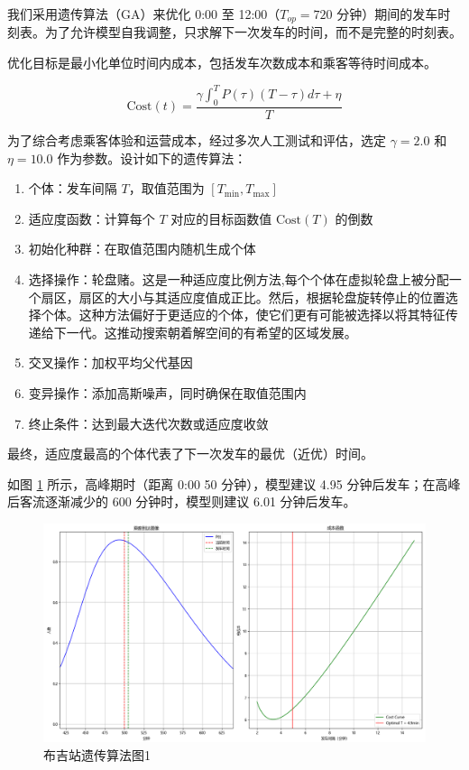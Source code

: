 
我们采用遗传算法（GA）\cite{HollandGA}来优化 0:00 至 12:00（$T_{op}=720$ 分钟）期间的发车时刻表。为了允许模型自我调整，只求解下一次发车的时间，而不是完整的时刻表。\cite{GoldbergGA}

优化目标是最小化单位时间内成本，包括发车次数成本和乘客等待时间成本。

$$
\text{Cost}(t) = \frac{\gamma \int _0 ^T P(\tau)(T-\tau)d\tau + \eta}{T}
$$

为了综合考虑乘客体验和运营成本，经过多次人工测试和评估，选定 $\gamma=2.0$ 和 $\eta=10.0$ 作为参数。设计如下的遗传算法：

\begin{enumerate}
    \item 个体：发车间隔 $T$，取值范围为 $[T_{\min}, T_{\max}]$
    \item 适应度函数：计算每个 $T$ 对应的目标函数值 $\text{Cost}(T)$ 的倒数
    \item 初始化种群：在取值范围内随机生成个体
    \item 选择操作：轮盘赌。这是一种适应度比例方法,每个个体在虚拟轮盘上被分配一个扇区，扇区的大小与其适应度值成正比。然后，根据轮盘旋转停止的位置选择个体。这种方法偏好于更适应的个体，使它们更有可能被选择以将其特征传递给下一代。这推动搜索朝着解空间的有希望的区域发展。
    \item 交叉操作：加权平均父代基因
    \item 变异操作：添加高斯噪声，同时确保在取值范围内
    \item 终止条件：达到最大迭代次数或适应度收敛
\end{enumerate}

最终，适应度最高的个体代表了下一次发车的最优（近优）时间。

如图 \ref{fig:gaBuji1} 所示，高峰期时（距离 0:00 50 分钟），模型建议 4.95 分钟后发车；在高峰后客流逐渐减少的 600 分钟时，模型则建议 6.01 分钟后发车。

\begin{figure}[htbp]
    \centering
    \includegraphics[width=1.0\textwidth]{res/Figure_7.png}
    \caption{布吉站遗传算法图1}
    \label{fig:gaBuji1}
\end{figure}

